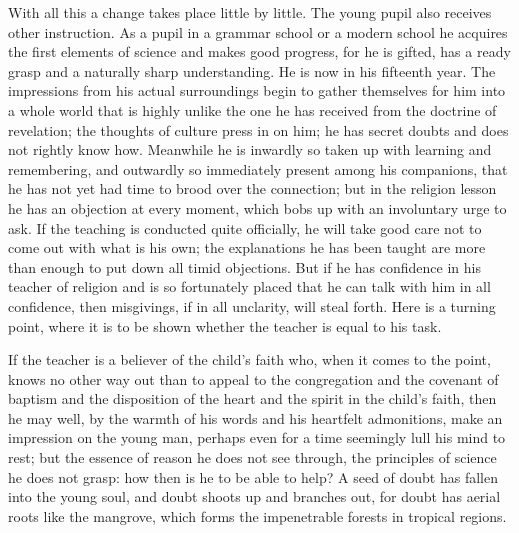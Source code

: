 \documentclass[12pt,a4paper,openany]{book}
\newcommand{\opage}[1]{\marginnote{\footnotesize\textit{[#1]}}}
\begin{document}
With all this a change takes place little by little. The young pupil also
receives other instruction. As a pupil in a grammar school or a modern
school he acquires the first elements of science and makes good
progress, for he is gifted, has a ready grasp and a naturally sharp
understanding. He is now in his fifteenth year. The impressions from his
actual surroundings begin to gather themselves for him into a whole world
that is highly unlike the one he has received from the doctrine of
revelation; the thoughts of culture press in on him; he has secret
doubts and does not rightly know how. Meanwhile he is inwardly so taken
up with learning and remembering, and outwardly so immediately present
among his companions, that he has not yet had time to brood over the
connection; but in the religion lesson he has an objection at every
moment, which bobs up with an involuntary urge to ask. If the teaching
is conducted quite officially, he will take good care not to come out
with what is his own; the \opage{44}explanations he has been taught are more than
enough to put down all timid objections. But if he has confidence in his
teacher of religion and is so fortunately placed that he can talk with
him in all confidence, then misgivings, if in all unclarity, will steal
forth. Here is a turning point, where it is to be shown whether the
teacher is equal to his task.

If the teacher is a believer of the child's faith who, when it comes to
the point, knows no other way out than to appeal to the congregation and
the covenant of baptism and the disposition of the heart and the spirit
in the child's faith, then he may well, by the warmth of his words and
his heartfelt admonitions, make an impression on the young man, perhaps
even for a time seemingly lull his mind to rest; but the essence of
reason he does not see through, the principles of science he does not
grasp: how then is he to be able to help? A seed of doubt has fallen into
the young soul, and doubt shoots up and branches out, for doubt has
aerial roots like the mangrove, which forms the impenetrable forests in
tropical regions.
\end{document}

